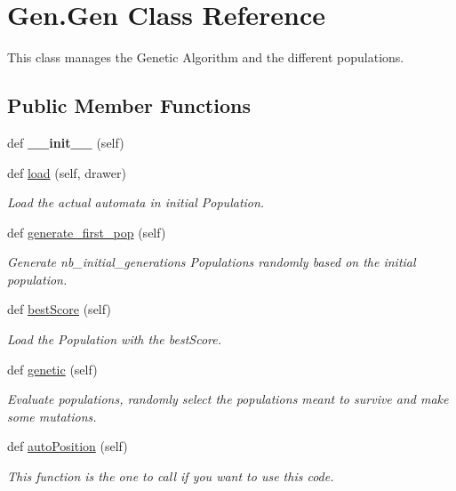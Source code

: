 \hypertarget{classGen_1_1Gen}{}\section{Gen.\+Gen Class Reference}
\label{classGen_1_1Gen}


This class manages the Genetic Algorithm and the different populations.  


\subsection*{Public Member Functions}
\begin{DoxyCompactItemize}
\item 
\mbox{\label{classGen_1_1Gen_a12efc62b7335e2f1dc0650236b633a02}} 
def {\bfseries \+\_\+\+\_\+init\+\_\+\+\_\+} (self)
\item 
def \mbox{\hyperlink{classGen_1_1Gen_a622c81f69a1c66c602b53c4e129d4ef0}{load}} (self, drawer)
\begin{DoxyCompactList}\small\item\em Load the actual automata in initial Population. \end{DoxyCompactList}\item 
def \mbox{\hyperlink{classGen_1_1Gen_a84990316f7099293e11beb6db22af61a}{generate\+\_\+first\+\_\+pop}} (self)
\begin{DoxyCompactList}\small\item\em Generate nb\+\_\+initial\+\_\+generations Populations randomly based on the initial population. \end{DoxyCompactList}\item 
def \mbox{\hyperlink{classGen_1_1Gen_a01f71de519b17878844ea430a8d7bfea}{best\+Score}} (self)
\begin{DoxyCompactList}\small\item\em Load the Population with the best\+Score. \end{DoxyCompactList}\item 
def \mbox{\hyperlink{classGen_1_1Gen_a1cfc3669f55357cea08509b0ed5cd1bf}{genetic}} (self)
\begin{DoxyCompactList}\small\item\em Evaluate populations, randomly select the populations meant to survive and make some mutations. \end{DoxyCompactList}\item 
def \mbox{\hyperlink{classGen_1_1Gen_ae1833b442b21f180fdc7987536a101d9}{auto\+Position}} (self)
\begin{DoxyCompactList}\small\item\em This function is the one to call if you want to use this code. \end{DoxyCompactList}\end{DoxyCompactItemize}
